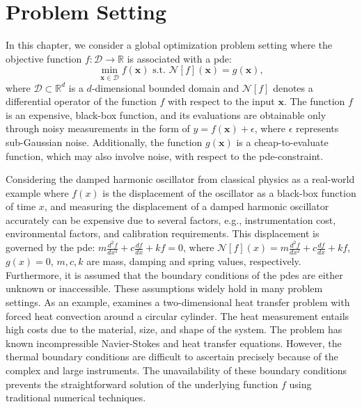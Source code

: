 \section{Problem Setting}
\label{section:pinn-bo_problem_setting}
In this chapter, we consider a global optimization problem setting where the objective function $f \colon \mathcal{D} \rightarrow \mathbb{R}$ is associated with a \ac{pde}:   
\begin{equation*}
        \underset{\mathbf{x} \in \mathcal{D}}{\min} f(\mathbf{x}) \text{ s.t. }  \mathcal{N}[f](\mathbf{x}) = g(\mathbf{x}),
\end{equation*} 
where $\mathcal{D} \subset \mathbb{R}^d$ is a $d$-dimensional bounded domain and $\mathcal{N}[f]$ denotes a differential operator of the function $f$ with respect to the input $\mathbf{x}$. The function $f$ is an expensive, black-box function, and its evaluations are obtainable only through noisy measurements in the form of $y = f(\mathbf{x}) + \epsilon$, where $\epsilon$ represents sub-Gaussian noise. Additionally, the function $g(\mathbf{x})$ is a cheap-to-evaluate function, which may also involve noise, with respect to the \ac{pde}-constraint.
\begin{remark}
    Considering the damped harmonic oscillator from classical physics as a real-world example where $f(x)$ is the displacement of the oscillator as a black-box function of time $x$, and measuring the displacement of a damped harmonic oscillator accurately can be expensive due to several factors, e.g., instrumentation cost, environmental factors, and calibration requirements. This displacement is governed by the \ac{pde}: $m \frac{d^2f}{dx^2} + c \frac{df}{dx} + kf = 0$, where $\mathcal{N}[f](x) = m \frac{d^2f}{dx^2} + c \frac{df}{dx} + kf$, $g(x)=0$, $m, c, k$ are mass, damping and spring values, respectively. Furthermore, it is assumed that the boundary conditions of the \acp{pde} are either unknown or inaccessible. These assumptions widely hold in many problem settings. As an example, \citet{cai2020heat} examines a two-dimensional heat transfer problem with forced heat convection around a circular cylinder. The heat measurement entails high costs due to the material, size, and shape of the system. The problem has known incompressible Navier-Stokes and heat transfer equations. However, the thermal boundary conditions are difficult to ascertain precisely because of the complex and large instruments. The unavailability of these boundary conditions prevents the straightforward solution of the underlying function $f$ using traditional numerical techniques.
\end{remark}


